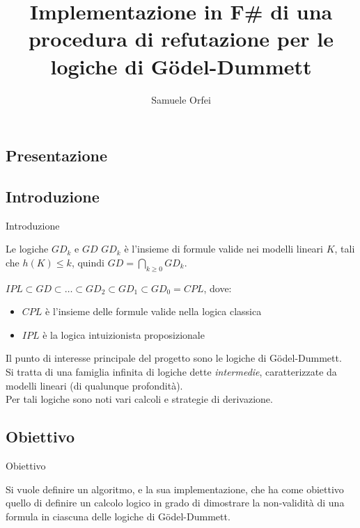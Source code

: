 \documentclass{beamer}
\title{Implementazione in F\# di una procedura di refutazione per le logiche di G\"odel-Dummett} %
\author{Samuele Orfei}
\begin{document}
\frame[c]{\maketitle}

\begin{darkframes}

    \section{Presentazione}

    \subsection{Introduzione}
    \begin{frame}{Introduzione}

        \begin{block}{Le logiche $GD_k$ e $GD$}
            $GD_k$ è l'insieme di formule valide nei modelli lineari $K$, tali che $h(K) \leq k$, quindi $GD = \bigcap_{k \geq 0}GD_k$.

            $IPL \subset GD \subset \dots \subset GD_2 \subset GD_1 \subset GD_0 = CPL$, dove:
            \begin{itemize}
                \item $CPL$ è l'insieme delle formule valide nella logica classica
                \item $IPL$ è la logica intuizionista proposizionale
            \end{itemize}


        \end{block}

        Il punto di interesse principale del progetto sono le logiche di G\"odel-Dummett. \\
        Si tratta di una famiglia infinita di logiche dette \textit{intermedie}, caratterizzate da modelli lineari (di qualunque profondità). \\
        Per tali logiche sono noti vari calcoli e strategie di derivazione.

    \end{frame}

    \subsection{Obiettivo}
    \begin{frame}{Obiettivo}

        Si vuole definire un algoritmo, e la sua implementazione, che ha come obiettivo quello di definire un calcolo logico in grado di dimostrare la non-validità di una formula in ciascuna delle logiche di G\"odel-Dummett.\\


\end{frame}
\end{darkframes}
\end{document}
